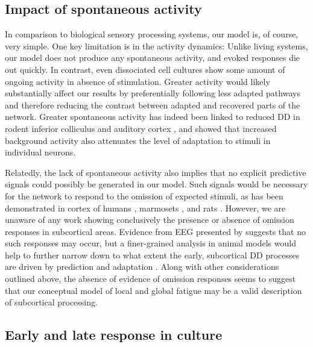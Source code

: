\documentclass[10pt,letterpaper]{article}
\begin{document}
\subsection*{Impact of spontaneous activity}

In comparison to biological sensory processing systems, our model is, of course, very simple. One key limitation is in the activity dynamics: Unlike living systems, our model does not produce any spontaneous activity, and evoked responses die out quickly. In contrast, even dissociated cell cultures show some amount of ongoing activity in absence of stimulation. Greater activity would likely substantially affect our results by preferentially following less adapted pathways and therefore reducing the contrast between adapted and recovered parts of the network. Greater spontaneous activity has indeed been linked to reduced DD in rodent inferior colliculus \cite{Duque2012-vx, Duque2015-eu} and auditory cortex \cite{Klein2014-op}, and \cite{Abolafia2011-ig} showed that increased background activity also attenuates the level of adaptation to stimuli in individual neurons.

Relatedly, the lack of spontaneous activity also implies that no explicit predictive signals could possibly be generated in our model. Such signals would be necessary for the network to respond to the omission of expected stimuli, as has been demonstrated in cortex of humans \cite{Lehmann2016-ol, Demarchi2019-ch}, marmosets \cite{Jiang2022-ak}, and rats \cite{Auksztulewicz2023-ta}. However, we are unaware of any work showing conclusively the presence or absence of omission responses in subcortical areas. Evidence from EEG presented by \cite{Lehmann2016-ol} suggests that no such responses may occur, but a finer-grained analysis in animal models would help to further narrow down to what extent the early, subcortical DD processes are driven by prediction and adaptation \cite{Schlossmacher2022-zv}. Along with other considerations outlined above, the absence of evidence of omission responses seems to suggest that our conceptual model of local and global fatigue may be a valid description of subcortical processing.

\subsection*{Early and late response in culture}
\end{document}

